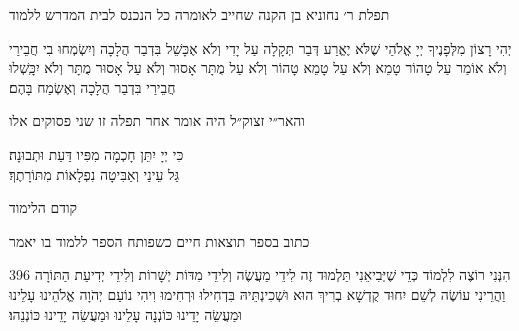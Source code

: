 \clearpage
\thispagestyle{empty}

\centerlastline
{
\small
\parskip 2pt
{\centering
  \scriptsize
  תפלת ר׳ נחוניא בן הקנה שחייב לאומרה כל הנכנס לבית המדרש ללמוד

}

יְהִי רָצוֹן מִלְּפָנֶיךָ יְיָ אֱלֹהַי שֶׁלֹּא יֶאֱרַע דְּבַר תְּקָלָה עַל יָדִי וְלֹא אֶכָּשֵׁל בִּדְבַר הֲלָכָה
וְיִשְׂמְחוּ בִי חֲבֵירַי וְלֹא אוֹמַר עַל טָהוֹר טָמֵא וְלֹא עַל טָמֵא טָהוֹר וְלֹא עַל מֻתָּר אָסוּר
וְלֹא עַל אָסוּר מֻתָּר וְלֹא יִכָּֽשְׁלוּ חֲבֵירַי בִּדְבַר הֲלָכָה וְאֶשְׂמַח בָּהֶם׃

{\centering
  {\scriptsize
    והאר״י זצוק״ל היה אומר אחר תפלה זו שני פסוקים אלו

    }
    כִּי יְיָ יִתֵּן חָכְמָה מִפִּיו דַּעַת וּתְבוּנָה׃\\
    גַּל עֵינַי וְאַבִּיטָה נִפְלָאוֹת מִתּוֹרָתֶךָ׃

    \vspace{1em}
   {\larger קודם הלימוד}

    {\scriptsize כתוב בספר תוצאות חיים כשפותח הספר ללמוד בו יאמר}
}

\begin{tp}{396}
הִנְּנִי רוֹצֶה לִלְמוֹד כְּדֵי שֶׁיְּבִיאֵנִי תַּלְמוּד זֶה לִידֵי מַעֲשֶׂה וְלִידֵי מִדּוֹת יְשָׁרוֹת\hdot
וְלִידֵי יְדִיעַת הַתּוֹרָה\hdot
וַהֲרֵינִי עוֹשֶׂה לְשֵׁם יִחוּד קֻדְשָׁא בְרִיךְ הוּא וּשְׁכִינְתֵּיהּ בִּדְחִילוּ וּרְחִימוּ\hdot
וִיהִי נוֹעַם יְהֹוָה אֱלֹהֵינוּ עָלֵינוּ וּמַעֲשֵׂה יָדֵינוּ כּוֹנְנָה עָלֵינוּ וּמַעֲשֵׂה יָדֵינוּ כּוֹנְנֵהוּ׃
\end{tp}

}
